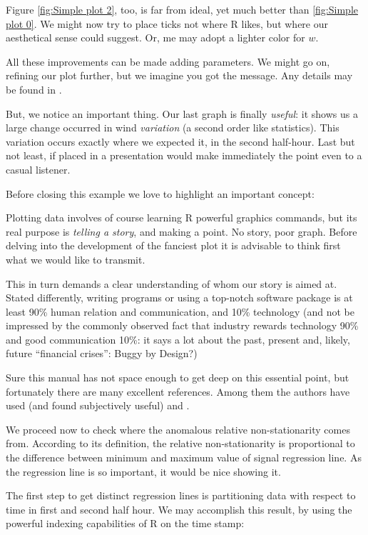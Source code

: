 \documentclass[a4paper,10pt]{book}
\begin{document}
Figure \ref{fig:Simple plot 2}, too, is far from ideal, yet much better than \ref{fig:Simple plot 0}. We might now try to place ticks not where R likes, but where our aesthetical sense could suggest. Or, me may adopt a lighter color for $w$.

All these improvements can be made adding parameters. We might go on, refining our plot further, but we imagine you got the message. Any details may be found in \cite{RManual}.

But, we notice an important thing. Our last graph is finally \emph{useful}: it shows us a large change occurred in wind \emph{variation} (a second order like statistics). This variation occurs exactly where we expected it, in the second half-hour. Last but not least, if placed in a presentation would make immediately the point even to a casual listener.

Before closing this example we love to highlight an important concept:

Plotting data involves of course learning R powerful graphics commands, but its real purpose is \emph{telling a story}, and making a point. No story, poor graph. Before delving into the development of the fanciest plot it is advisable to think first what we would like to transmit.

This in turn demands a clear understanding of whom our story is aimed at. Stated differently, writing programs or using a top-notch software package is at least 90\% human relation and communication, and 10\% technology (and not be impressed by the commonly observed fact that industry rewards technology 90\% and good communication 10\%: it says a lot about the past, present and, likely, future ``financial crises'': Buggy by Design?)

Sure this manual has not space enough to get deep on this essential point, but fortunately there are many excellent references. Among them the authors have used (and found subjectively useful) \cite{Maindonald2007} and \cite{Venables2002}.

We proceed now to check where the anomalous relative non-stationarity comes from. According to its definition, the relative non-stationarity is proportional to the difference between minimum and maximum value of signal regression line. As the regression line is so important, it would be nice showing it.

The first step to get distinct regression lines is partitioning data with respect to time in first and second half hour. We may accomplish this result, by using the powerful indexing capabilities of R on the time stamp:
\end{document}
